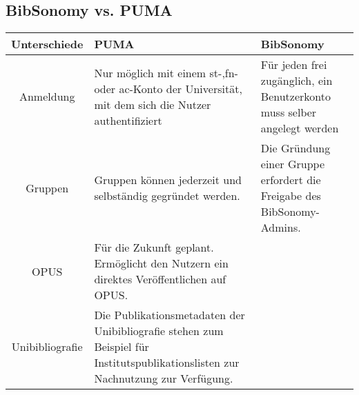\subsection{BibSonomy vs. PUMA}
\small
\begin{longtable}{|c|m{4cm}|m{4cm}|}\hline
	\bfseries Unterschiede & \bfseries PUMA & \bfseries BibSonomy\\ \hline
	Anmeldung& Nur möglich mit einem st-,fn- oder ac-Konto der Universität, mit dem sich die Nutzer authentifiziert  & Für jeden frei zugänglich, ein Benutzerkonto muss selber angelegt werden \\ \hline
	 Gruppen\index{Gruppen} & Gruppen können jederzeit und selbständig gegründet werden. & Die Gründung einer Gruppe erfordert die Freigabe des BibSonomy-Admins. \\ \hline
	OPUS\index{OPUS} & Für die Zukunft geplant. Ermöglicht den Nutzern ein direktes Veröffentlichen auf OPUS. & \\ \hline
	Unibibliografie\index{Unibibliografie}& Die Publikationsmetadaten der Unibibliografie stehen zum Beispiel für Institutspublikationslisten zur Nachnutzung zur Verfügung.&\\ \hline
\end{longtable}
\normalsize
